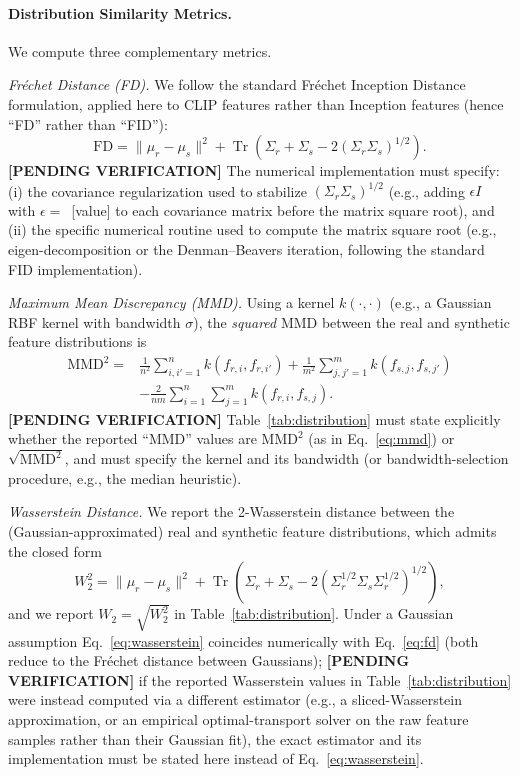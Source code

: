 \documentclass[journal]{IEEEtran}
\begin{document}
\paragraph{Distribution Similarity Metrics.}
We compute three complementary metrics.

\emph{Fr\'echet Distance (FD).} We follow the standard Fr\'echet Inception
Distance formulation, applied here to CLIP features rather than Inception
features (hence ``FD'' rather than ``FID''):
\begin{equation}
\mathrm{FD}
=
\|\mu_r-\mu_s\|^2
+
\operatorname{Tr}
\left(
\Sigma_r+\Sigma_s-2(\Sigma_r\Sigma_s)^{1/2}
\right).
\label{eq:fd}
\end{equation}
\textbf{[PENDING VERIFICATION]} The numerical implementation must specify:
(i) the covariance regularization used to stabilize $(\Sigma_r\Sigma_s)^{1/2}$
(e.g., adding $\epsilon I$ with $\epsilon=$~[value] to each covariance
matrix before the matrix square root), and (ii) the specific numerical
routine used to compute the matrix square root (e.g., eigen-decomposition
or the Denman--Beavers iteration, following the standard FID
implementation).

\emph{Maximum Mean Discrepancy (MMD).} Using a kernel $k(\cdot,\cdot)$
(e.g., a Gaussian RBF kernel with bandwidth $\sigma$), the \emph{squared}
MMD between the real and synthetic feature distributions is
\begin{equation}
\begin{aligned}
\mathrm{MMD}^2
={}&
\frac{1}{n^2}\sum_{i,i'=1}^{n}k(f_{r,i},f_{r,i'})
+
\frac{1}{m^2}\sum_{j,j'=1}^{m}k(f_{s,j},f_{s,j'})\\
&-
\frac{2}{nm}\sum_{i=1}^{n}\sum_{j=1}^{m}k(f_{r,i},f_{s,j}).
\end{aligned}
\label{eq:mmd}
\end{equation}
\textbf{[PENDING VERIFICATION]} Table~\ref{tab:distribution} must state
explicitly whether the reported ``MMD'' values are $\mathrm{MMD}^2$ (as in
Eq.~\eqref{eq:mmd}) or $\sqrt{\mathrm{MMD}^2}$, and must specify the kernel
and its bandwidth (or bandwidth-selection procedure, e.g., the median
heuristic).

\emph{Wasserstein Distance.} We report the 2-Wasserstein distance between
the (Gaussian-approximated) real and synthetic feature distributions,
which admits the closed form
\begin{equation}
W_2^2
=
\|\mu_r-\mu_s\|^2
+
\operatorname{Tr}
\left(
\Sigma_r+\Sigma_s-2(\Sigma_r^{1/2}\Sigma_s\Sigma_r^{1/2})^{1/2}
\right),
\label{eq:wasserstein}
\end{equation}
and we report $W_2=\sqrt{W_2^2}$ in Table~\ref{tab:distribution}. Under a
Gaussian assumption Eq.~\eqref{eq:wasserstein} coincides numerically with
Eq.~\eqref{eq:fd} (both reduce to the Fr\'echet distance between Gaussians);
\textbf{[PENDING VERIFICATION]} if the reported Wasserstein values in
Table~\ref{tab:distribution} were instead computed via a different
estimator (e.g., a sliced-Wasserstein approximation, or an empirical
optimal-transport solver on the raw feature samples rather than their
Gaussian fit), the exact estimator and its implementation must be stated
here instead of Eq.~\eqref{eq:wasserstein}.
\end{document}
